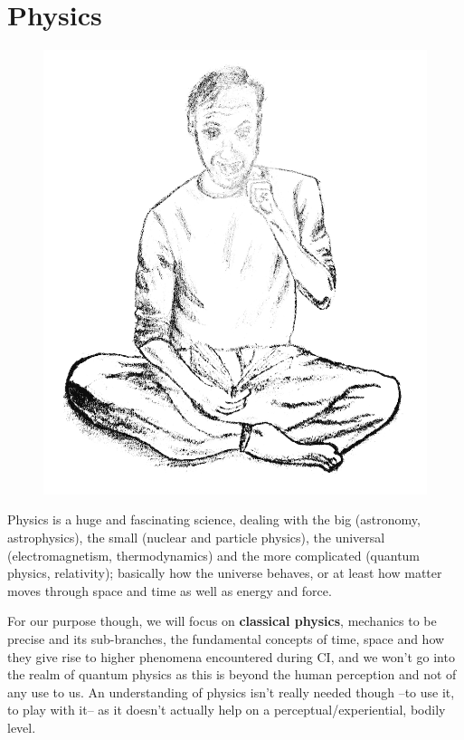 \chapter{Physics}\label{ch:physics}

\begin{figure}[h]
    \begin{center}
    {\includegraphics[width=0.3\paperwidth]{images/testpic}}
    \end{center}\label{img:physics}
\end{figure}

Physics is a huge and fascinating science, dealing with the big (astronomy, astrophysics), the small (nuclear and particle physics), the universal (electromagnetism, thermodynamics) and the more complicated (quantum physics, relativity); basically how the universe behaves, or at least how matter moves through space and time as well as energy and force.

For our purpose though, we will focus on \textbf{classical physics}, mechanics to be precise and its sub-branches, the fundamental concepts of time, space and how they give rise to higher phenomena encountered during CI, and we won't go into the realm of quantum physics as this is beyond the human perception and not of any use to us.
An understanding of physics isn't really needed though --to use it, to play with it-- as it doesn't actually help on a perceptual/experiential, bodily level.

